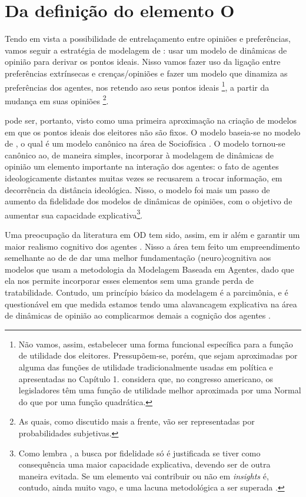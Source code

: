 \section{Da definição do elemento O}

Tendo em vista a possibilidade de entrelaçamento entre opiniões e preferências,
vamos seguir a estratégia de modelagem de : usar
um modelo de dinâmicas de opinião para derivar os pontos ideais. Nisso vamos
fazer uso da ligação entre preferências extrínsecas e crenças/opiniões e fazer
um modelo que dinamiza as preferências dos agentes, nos retendo aso seus pontos ideais
\footnote{Não vamos, assim, estabelecer uma forma funcional específica para a
  função de utilidade dos eleitores. Pressupõem-se, porém, que sejam aproximadas
  por alguma das funções de utilidade tradicionalmente usadas em política e
  apresentadas no Capítulo 1.  considera que,
  no congresso americano, os legisladores têm uma função de utilidade melhor
  aproximada por uma Normal do que por uma função quadrática.}, a partir da
mudança em suas opiniões \footnote{As quais, como discutido mais a frente, vão
  ser representadas por probabilidades subjetivas.}.

 pode ser, portanto, visto como uma primeira
aproximação na criação de modelos em que os pontos ideais dos eleitores não são
fixos. O modelo baseia-se no modelo de , o qual é
um modelo canônico na área de Sociofísica \cite{galam1982sociophysics}. O modelo
tornou-se canônico ao, de maneira simples, incorporar à modelagem de dinâmicas
de opinião um elemento importante na interação dos agentes: o fato de agentes
ideologicamente distantes muitas vezes se recusarem a trocar informação, em
decorrência da distância ideológica. Nisso, o modelo foi mais um passo de
aumento da fidelidade dos modelos de dinâmicas de opiniões, com o objetivo de
aumentar sua capacidade  explicativa\footnote{Como lembra , a busca por
  fidelidade só é justificada se tiver como consequência uma maior capacidade
  explicativa, devendo ser de outra maneira evitada. Se um elemento vai
  contribuir ou não em \textit{insights} é, contudo, ainda muito vago, e uma
  lacuna metodológica a ser superada
  \cite{ragan2010embarrassment}.}. 

Uma preocupação da literatura em OD tem sido, assim, em ir além e garantir um
maior realismo cognitivo dos agentes \cite{duggins2014psychologically,homer2013complex,abrica2017effects}. Nisso a
área tem feito um empreendimento semelhante ao de
 de dar uma melhor fundamentação
(neuro)cognitiva aos modelos que usam a metodologia da Modelagem Baseada em
Agentes, dado que ela nos permite incorporar esses elementos sem uma grande
perda de tratabilidade. Contudo, um princípio básico da modelagem é a
parcimônia, e é questionável em que medida estamos tendo uma alavancagem
explicativa na área de dinâmicas de opinião ao complicarmos demais a cognição
dos agentes \cite{lave1993introduction,sznajd2014person}.

